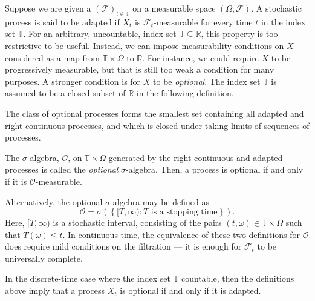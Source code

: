 \documentclass[12pt]{article}
\begin{document}

Suppose we are given a  $(\mathcal{F})_{t\in\mathbb{T}}$ on a measurable space $(\Omega,\mathcal{F})$. A stochastic process is said to be adapted if $X_t$ is $\mathcal{F}_t$-measurable for every time $t$ in the index set $\mathbb{T}$. For an arbitrary, uncountable, index set $\mathbb{T}\subseteq\mathbb{R}$, this property is too restrictive to be useful. Instead, we can impose measurability conditions on $X$ considered as a map from $\mathbb{T}\times\Omega$ to $\mathbb{R}$.
For instance, we could require $X$ to be progressively measurable, but that is still too weak a condition for many purposes. A stronger condition is for $X$ to be \emph{optional}. The index set $\mathbb{T}$ is assumed to be a closed subset of $\mathbb{R}$ in the following definition.

The class of optional processes forms the smallest set containing all adapted and right-continuous processes, and which is closed under taking limits of sequences of processes.

The $\sigma$-algebra, $\mathcal{O}$, on $\mathbb{T}\times\Omega$ generated by the right-continuous and adapted processes is called the \emph{optional} $\sigma$-algebra. Then, a process is optional if and only if it is $\mathcal{O}$-measurable.

Alternatively, the optional $\sigma$-algebra may be defined as
\begin{equation*}
\mathcal{O}=\sigma\left(\left\{[T,\infty):T\textrm{ is a stopping time}\right\}\right).
\end{equation*}
Here, $[T,\infty)$ is a stochastic interval, consisting of the pairs $(t,\omega)\in\mathbb{T}\times\Omega$ such that $T(\omega)\le t$.
In continuous-time, the equivalence of these two definitions for $\mathcal{O}$ does require mild conditions on the filtration --- it is enough for $\mathcal{F}_t$ to be universally complete.

In the discrete-time case where the index set $\mathbb{T}$ countable, then the definitions above imply that a process $X_t$ is optional if and only if it is adapted.

\end{document}
